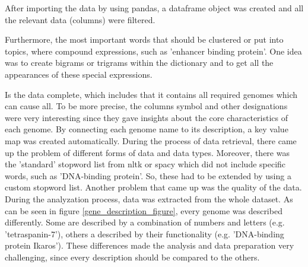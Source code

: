 After importing the data by using pandas, a dataframe object was created and all the relevant data (columns) were filtered.

Furthermore, the most important words that should be clustered or put into topics, where compound expressions, such as 'enhancer binding protein'. One idea was to create bigrams or trigrams within the dictionary and to get all the appearances of these special expressions.

Is the data complete, which includes that it contains all required genomes which can cause \ac{all}. To be more precise, the columns symbol and other designations were very interesting  since they gave insights about the core characteristics of each genome. By connecting each genome name to its description, a key value map was created automatically.
During the process of data retrieval, there came up the problem of different forms of data and data types. 
Moreover, there was the 'standard' stopword list from \ac{nltk} or spacy which did not include specific words, such as 'DNA-binding protein'. So, these had to be extended by using a custom stopword list.
Another problem that came up was the quality of the data. During the analyzation process, data was extracted from the whole dataset. As can be seen in figure \ref{gene_description_figure}, every genome was described differently. Some are described by a combination of numbers and letters (e.g. 'tetraspanin-7'), others a described by their functionality (e.g. 'DNA-binding protein Ikaros'). These differences made the analysis and data preparation very challenging, since every description should be compared to the others.


